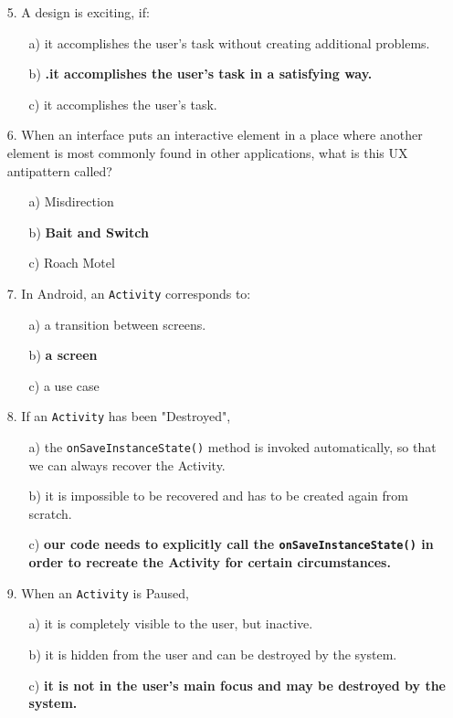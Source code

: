 \documentclass[12pt]{book}
\begin{document}
\begin{itemize}
    \item[5.] A design is exciting, if:
    \begin{itemize}
        \item[a)] it accomplishes the user's task without creating additional problems.
        \item[b)] \textbf{.it accomplishes the user's task in a satisfying way.}
        \item[c)] it accomplishes the user's task.
    \end{itemize}
    
    \item[6.] When an interface puts an interactive element in a place where another element is most commonly found in other applications, what is this UX antipattern called?
    \begin{itemize}
        \item[a)] Misdirection
        \item[b)] \textbf{Bait and Switch}
        \item[c)] Roach Motel
    \end{itemize}
    
    \item[7.] In Android, an \texttt{Activity} corresponds to:
    \begin{itemize}
        \item[a)] a transition between screens.
        \item[b)] \textbf{a screen}
        \item[c)] a use case
    \end{itemize}
    
    \item[8.] If an \texttt{Activity} has been "Destroyed",
    \begin{itemize}
        \item[a)] the \texttt{onSaveInstanceState()} method is invoked automatically, so that we can always recover the Activity.
        \item[b)] it is impossible to be recovered and has to be created again from scratch.
        \item[c)] \textbf{our code needs to explicitly call the \texttt{onSaveInstanceState()} in order to recreate the Activity for certain circumstances.}
    \end{itemize}
    
    \item[9.] When an \texttt{Activity} is Paused,
    \begin{itemize}
        \item[a)] it is completely visible to the user, but inactive.
        \item[b)] it is hidden from the user and can be destroyed by the system.
        \item[c)] \textbf{it is not in the user's main focus and may be destroyed by the system.}
    \end{itemize}
    

\end{itemize}
\end{document}
